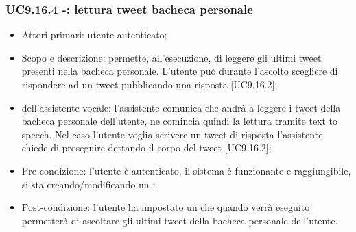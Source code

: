 \subsubsection{UC9.16.4 -: lettura tweet bacheca personale}
\begin{itemize}
	\item  Attori primari: utente autenticato;
	\item  Scopo e descrizione: permette, all'esecuzione, di leggere gli ultimi tweet presenti nella bacheca personale. L'utente può durante l'ascolto scegliere di rispondere ad un tweet pubblicando una risposta [UC9.16.2];
	\item  {} dell'assistente vocale: l'assistente comunica che andrà a leggere i tweet della bacheca personale dell'utente, ne comincia quindi la lettura tramite text to speech. Nel caso l'utente voglia scrivere un tweet di risposta l'assistente chiede di proseguire dettando il corpo del tweet [UC9.16.2];
	\item  Pre-condizione: l'utente è autenticato, il sistema è funzionante e raggiungibile, si sta creando/modificando un ;
	\item  Post-condizione: l'utente ha impostato un  che quando verrà eseguito permetterà di ascoltare gli ultimi tweet della bacheca personale dell'utente.
\end{itemize}

